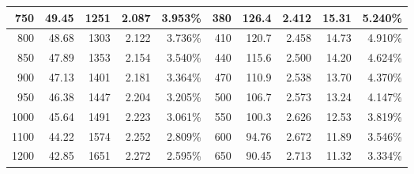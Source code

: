 \documentclass{article}
\begin{document}
\begin{table}[p]
\begin{tabular}{|r|r|r|r|r|r|r|r|r|r|}
        \hline
        750                           & 49.45                                & 1251                      & 2.087                     & 3.953\%                   & 380                     & 126.4                     & 2.412                     & 15.31                    & 5.240\% \bigstrut                   \\
        \hline
        800                           & 48.68                                & 1303                      & 2.122                     & 3.736\%                   & 410                     & 120.7                     & 2.458                     & 14.73                    & 4.910\% \bigstrut                   \\
        \hline
        850                           & 47.89                                & 1353                      & 2.154                     & 3.540\%                   & 440                     & 115.6                     & 2.500                     & 14.20                    & 4.624\% \bigstrut                   \\
        \hline
        900                           & 47.13                                & 1401                      & 2.181                     & 3.364\%                   & 470                     & 110.9                     & 2.538                     & 13.70                    & 4.370\% \bigstrut                   \\
        \hline
        950                           & 46.38                                & 1447                      & 2.204                     & 3.205\%                   & 500                     & 106.7                     & 2.573                     & 13.24                    & 4.147\% \bigstrut                   \\
        \hline
        1000                          & 45.64                                & 1491                      & 2.223                     & 3.061\%                   & 550                     & 100.3                     & 2.626                     & 12.53                    & 3.819\% \bigstrut                   \\
        \hline
        1100                          & 44.22                                & 1574                      & 2.252                     & 2.809\%                   & 600                     & 94.76                     & 2.672                     & 11.89                    & 3.546\% \bigstrut                   \\
        \hline
        1200                          & 42.85                                & 1651                      & 2.272                     & 2.595\%                   & 650                     & 90.45                     & 2.713                     & 11.32                    & 3.334\% \bigstrut                   \\

\end{tabular}
\end{table}
\end{document}
